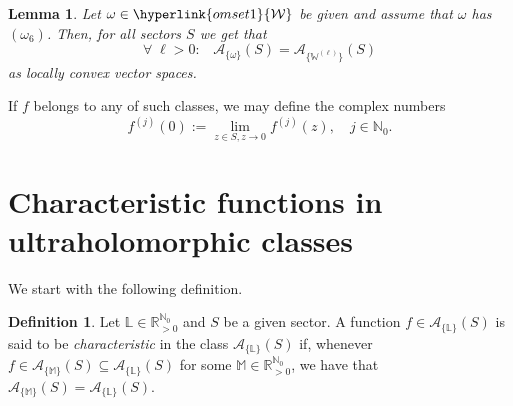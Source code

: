 \documentclass[11pt,a4paper]{article}
\theoremstyle{plain}
\newtheorem{lemma}[proposition]{Lemma}
\theoremstyle{definition}
\newtheorem{definition}[proposition]{Definition}
\newcommand{\RR}{\mathbb{R}}
\newcommand{\NN}{\mathbb{N}}
\newcommand{\M}{\mathbb{M}}
\newcommand{\LL}{\mathbb{L}}
\newcommand{\W}{\mathbb{W}}
\begin{document}
\begin{lemma}\label{om6lemma}
	Let $\omega\in\hyperlink{omset1}{\mathcal{W}}$ be given and assume that $\omega$ has \hyperlink{om6}{$(\omega_6)$}. Then, for all sectors $S$ we get that
$$\forall\;\ell>0:\;\;\;\mathcal{A}_{\{\omega\}}(S)=\mathcal{A}_{\{\W^{(\ell)}\}}(S)$$
as locally convex vector spaces.
\end{lemma}


If $f$ belongs to any of such classes, we may define the complex numbers $$f^{(j)}(0):=\lim_{z\in S, z\rightarrow 0}f^{(j)}(z),\quad j\in\NN_0.
$$

\section{Characteristic functions in ultraholomorphic classes}\label{sect.CharactFunctions}

We start with the following definition.

%
%
%
%

\begin{definition}\label{chardef}
	Let $\LL\in\RR_{>0}^{\NN_0}$ and $S$ be a given sector.
%	
A function $f\in \mathcal{A}_{\{\LL\}} (S)$ is said to be \textit{characteristic} in the class $\mathcal{A}_{\{\LL\}} (S)$ if, whenever $f\in \mathcal{A}_{\{\M\}} (S)\subseteq \mathcal{A}_{\{\LL\}} (S)$ for some $\M\in\RR_{>0}^{\NN_0}$, we have that $\mathcal{A}_{\{\M\}} (S)= \mathcal{A}_{\{\LL\}} (S)$.
\end{definition}
\end{document}
